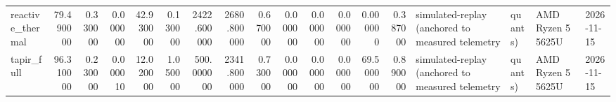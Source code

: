 \begin{tabular}{lrrrrrrrrrrrrrlll}
reactive_thermal & 79.490000 & 0.330000 & 0.000000 & 42.930000 & 0.130000 & 2422.600000 & 2680.800000 & 0.670000 & 0.000000 & 0.000000 & 0.000000 & 0.000000 & 0.387000 & simulated-replay (anchored to measured telemetry & quants) & AMD Ryzen 5 5625U & 2026-11-15 \\
tapir_full & 96.310000 & 0.230000 & 0.000010 & 12.020000 & 1.050000 & 500.000000 & 2341.800000 & 0.730000 & 0.000000 & 0.000000 & 0.000000 & 69.500000 & 0.890000 & simulated-replay (anchored to measured telemetry & quants) & AMD Ryzen 5 5625U & 2026-11-15 \\
\bottomrule
\end{tabular}

